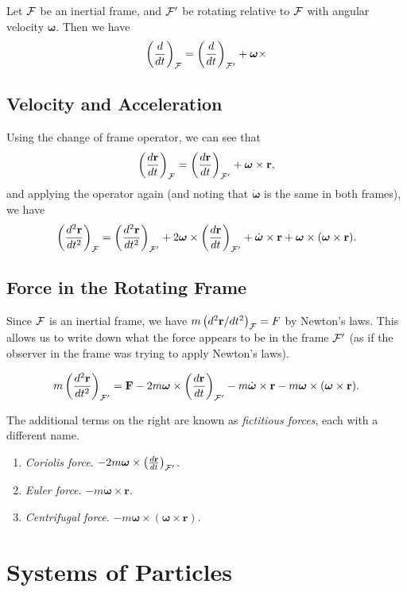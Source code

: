 \documentclass[11pt, a4paper]{scrartcl}
\newcommand{\vv}[1]{\boldsymbol{\mathbf{#1}}}
\theoremstyle{definition}
\begin{document}
Let $\mathcal{F}$ be an inertial frame, and $\mathcal{F}'$ be rotating relative to $\mathcal{F}$ with angular velocity $\vv \omega$.
Then we have
$$
\left(\frac{d}{d t}\right)_{\FF} = \left(\frac{d}{d t}\right)_{\FF'} +\vv \omega \times 
$$

\subsection*{Velocity and Acceleration}

Using the change of frame operator, we can see that
$$
\left(\frac{d \vv r}{d t}\right)_{\FF} = \left(\frac{d \vv r}{d t}\right)_{\FF'} +\vv \omega \times \vv r,
$$
and applying the operator again (and noting that $\dot{\vv \omega}$ is the same in both frames), we have
$$
\left(\frac{d^2 \vv r}{d t^2}\right)_{\FF} = \left(\frac{d^2 \vv r}{d t^2}\right)_{\FF'} + 2 \vv \omega \times \left(\frac{d \vv r}{d t}\right)_{\FF'} + \dot{\vv \omega} \times \vv r + \vv \omega \times (\vv \omega \times \vv r).
$$

\subsection*{Force in the Rotating Frame}

Since $\mathcal{F}$ is an inertial frame, we have $m\left(d^2 \vv r/ dt^2\right)_{\FF} = F$ by Newton's laws. This allows us to write down what the force appears to be in the frame $\mathcal{F}'$ (as if the observer in the frame was trying to apply Newton's laws).

$$
m \left(\frac{d^2 \vv r}{dt^2}\right)_{\FF'} = \vv F - 2m \vv \omega \times \left(\frac{d \vv r}{d t}\right)_{\FF'} - m\dot{\vv \omega} \times \vv r - m\vv \omega \times (\vv \omega \times \vv r).
$$

The additional terms on the right are known as \emph{fictitious forces}, each with a different name.

\begin{enumerate}
	\item \emph{Coriolis force}. $- 2m \vv \omega \times \left(\frac{d \vv r}{d t}\right)_{\FF'}$.
	\item \emph{Euler force}. $- m\dot{\vv \omega} \times \vv r$.
	\item \emph{Centrifugal force}. $- m\vv \omega \times (\vv \omega \times \vv r)$.
\end{enumerate}

\clearpage

\section{Systems of Particles}
\end{document}
